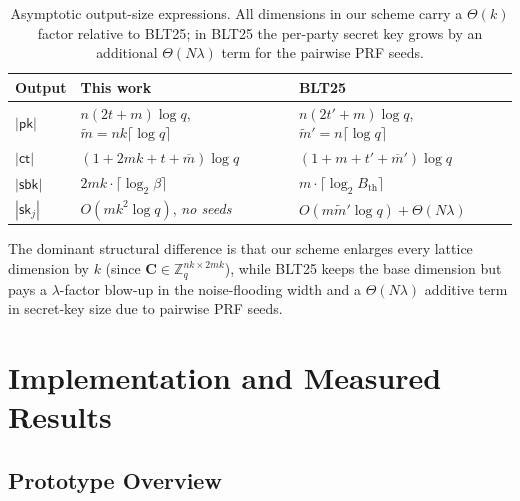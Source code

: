 \begin{table}[h]
\centering
\renewcommand{\arraystretch}{1.3}
\begin{tabular}{|l|l|l|}
\hline
\textbf{Output} & \textbf{This work} & \textbf{\textsf{BLT25}~\cite{EPRINT:BonLauTas25}} \\
\hline
$|\mathsf{pk}|$
& $n(2t+m)\log q$, \quad $\widetilde{m} = nk\lceil\log q\rceil$
& $n(2t'+m)\log q$, \quad $\widetilde{m}' = n\lceil\log q\rceil$ \\
\hline
$|\mathsf{ct}|$
& $(1+2mk+t+\overline{m})\log q$
& $(1+m+t'+\overline{m}')\log q$ \\
\hline
$|\mathsf{sbk}|$
& $2mk\cdot\lceil\log_2\beta\rceil$
& $m\cdot\lceil\log_2 B_{\mathrm{th}}\rceil$ \\
\hline
$|\mathsf{sk}_j|$
& $O(mk^2\log q)$, \emph{no seeds}
& $O(m\widetilde{m}'\log q) + \Theta(N\lambda)$ \\
\hline
\end{tabular}
\caption{Asymptotic output-size expressions.
All dimensions in our scheme carry a $\Theta(k)$ factor relative to \textsf{BLT25};
in \textsf{BLT25} the per-party secret key grows by an additional $\Theta(N\lambda)$
term for the pairwise PRF seeds.}
\label{tab:size-vs-blt}
\end{table}

The dominant structural difference is that our scheme enlarges every lattice dimension by
$k$ (since $\mathbf{C}\in\mathbb{Z}_q^{nk\times 2mk}$), while \textsf{BLT25} keeps the
base dimension but pays a $\lambda$-factor blow-up in the noise-flooding width and a
$\Theta(N\lambda)$ additive term in secret-key size due to pairwise PRF seeds.

\section{Implementation and Measured Results}
\label{sec:implementation}

\subsection{Prototype Overview}

